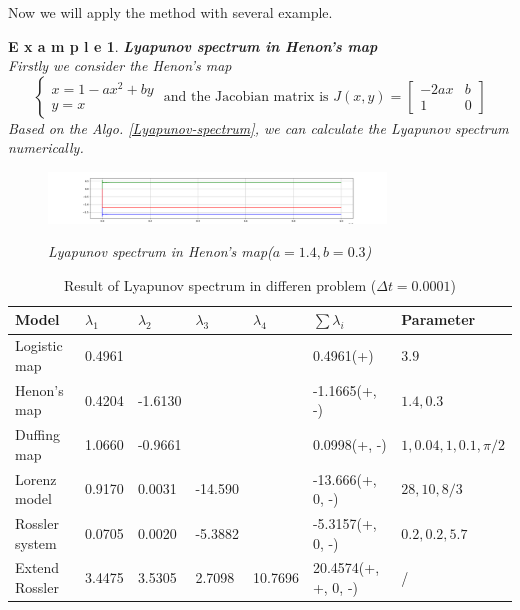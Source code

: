\documentclass[12pt]{article}
\theoremstyle{plain}
\newtheorem{example}{\textbf{E x a m p l e}}[section]
\begin{document}
Now we will apply the method with several example.


\begin{example}\textbf{Lyapunov spectrum in Henon's map}
\\\noindent Firstly we consider the Henon's map
$$
\left\{\begin{array}{l}
x = 1 - ax^2 + by \\
y = x
\end{array}\right. \text{ and the Jacobian matrix is } J(x, y) = \left[\begin{array}{lll}
-2ax    & b \\
1       & 0
\end{array}\right]
$$
Based on the Algo. \ref{Lyapunov-spectrum}, we can calculate the Lyapunov spectrum numerically.
\begin{figure}[H]
\begin{center}
\includegraphics[width=0.8\textwidth]{figure/section5/Lya-spe-Henon.png} \\
\caption{Lyapunov spectrum in Henon's map($a = 1.4, b = 0.3$)}
\end{center}
\end{figure}
\end{example}




\newpage
\begin{table}[H]
\centering  
\caption{Result of Lyapunov spectrum in differen problem ($\Delta t =0.0001$)}  
\begin{tabular}{|l||llll|l||l|}
\hline
Model           & $\lambda_1$ & $\lambda_2$ & $\lambda_3$ & $\lambda_4$ 
                                                        & $\sum\lambda_i$ 
                                                                  & Parameter \\
\hline
\hline
Logistic map    & 0.4961  &         &         &         & 0.4961(+)           & $3.9$ \\
Henon's map     & 0.4204  & -1.6130 &         &         & -1.1665(+, -)       & $1.4, 0.3$ \\
Duffing map     & 1.0660  & -0.9661 &         &         & 0.0998(+, -)        & $1, 0.04, 1, 0.1, \pi/2$ \\
Lorenz model    & 0.9170  & 0.0031  & -14.590 &         & -13.666(+, 0, -)    & $28, 10, 8/3$ \\
Rossler system  & 0.0705  & 0.0020  & -5.3882 &         & -5.3157(+, 0, -)    & $0.2, 0.2, 5.7$ \\
Extend Rossler  & 3.4475  & 3.5305  & 2.7098  & 10.7696 & 20.4574(+, +, 0, -) & /\\
\hline
\end{tabular}  
\end{table}
\end{document}
